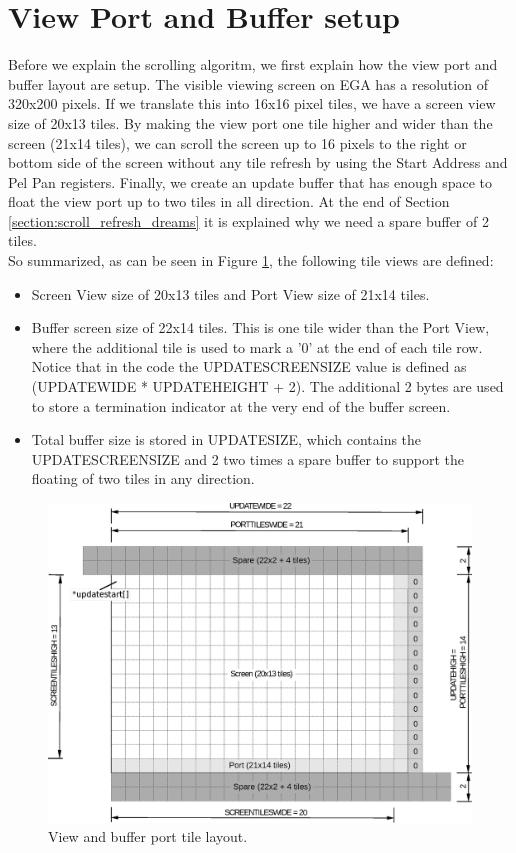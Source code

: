 \documentclass[book.tex]{subfiles}
\begin{document}
\section{View Port and Buffer setup}
Before we explain the scrolling algoritm, we first explain how the view port and buffer layout are setup. The visible viewing screen on EGA has a resolution of 320x200 pixels. If we translate this into 16x16 pixel tiles, we have a screen view size of 20x13 tiles. By making the view port one tile higher and wider than the screen (21x14 tiles), we can scroll the screen up to 16 pixels to the right or bottom side of the screen without any tile refresh by using the Start Address and Pel Pan registers. Finally, we create an update buffer that has enough space to float the view port up to two tiles in all direction. At the end of Section \ref{section:scroll_refresh_dreams} it is explained why we need a spare buffer of 2 tiles.\\

So summarized, as can be seen in Figure \ref{fig:screen_setup}, the following tile views are defined:
\begin{itemize}
\item Screen View size of 20x13 tiles and Port View size of 21x14 tiles.
\item Buffer screen size of 22x14 tiles. This is one tile wider than the Port View, where the additional tile is used to mark a '0' at the end of each tile row. Notice that in the code the UPDATESCREENSIZE value is defined as (UPDATEWIDE * UPDATEHEIGHT + 2). The additional 2 bytes are used to store a termination indicator at the very end of the buffer screen.
\item Total buffer size is stored in UPDATESIZE, which contains the UPDATESCREENSIZE and 2 two times a spare buffer to support the floating of two tiles in any direction.
\end{itemize}
\par
 
\begin{figure}[H]
\centering
\includegraphics[width=\textwidth]{imgs/drawings/buffer_tile_layout.eps}
\caption{View and buffer port tile layout.}
\label{fig:screen_setup}
\end{figure}
\end{document}
